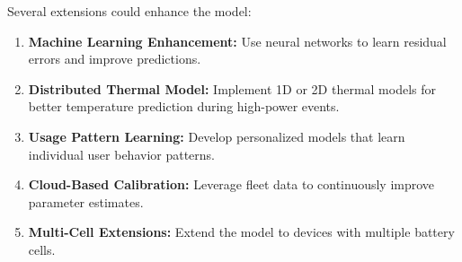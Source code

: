 Several extensions could enhance the model:

\begin{enumerate}
    \item \textbf{Machine Learning Enhancement:} Use neural networks to learn residual errors and improve predictions.
    
    \item \textbf{Distributed Thermal Model:} Implement 1D or 2D thermal models for better temperature prediction during high-power events.
    
    \item \textbf{Usage Pattern Learning:} Develop personalized models that learn individual user behavior patterns.
    
    \item \textbf{Cloud-Based Calibration:} Leverage fleet data to continuously improve parameter estimates.
    
    \item \textbf{Multi-Cell Extensions:} Extend the model to devices with multiple battery cells.
\end{enumerate}

